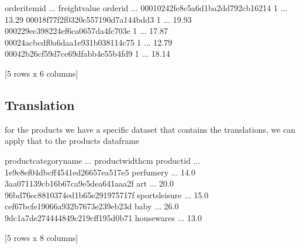 \documentclass[letterpaper,10pt,english]{jupyterBook}
\begin{document}
\begin{sphinxVerbatim}[commandchars=\\\{\}]
                                  order\PYGZus{}item\PYGZus{}id  ... freight\PYGZus{}value
order\PYGZus{}id                                         ...              
00010242fe8c5a6d1ba2dd792cb16214              1  ...         13.29
00018f77f2f0320c557190d7a144bdd3              1  ...         19.93
000229ec398224ef6ca0657da4fc703e              1  ...         17.87
00024acbcdf0a6daa1e931b038114c75              1  ...         12.79
00042b26cf59d7ce69dfabb4e55b4fd9              1  ...         18.14

[5 rows x 6 columns]
\end{sphinxVerbatim}


\subsection{Translation}
\label{\detokenize{c7_case_studies/Olist:translation}}
\sphinxAtStartPar
for the products we have a specific dataset that contains the translations, we can apply that to the products dataframe

\begin{sphinxVerbatim}[commandchars=\\\{\}]
    \PYG{p}{[}\PYG{p}{]}
\PYG{p}{[}\PYG{p}{]}  \PYG{p}{[}\PYG{p}{]}
\end{sphinxVerbatim}

\begin{sphinxVerbatim}[commandchars=\\\{\}]
                                 product\PYGZus{}category\PYGZus{}name  ...  product\PYGZus{}width\PYGZus{}cm
product\PYGZus{}id                                              ...                  
1e9e8ef04dbcff4541ed26657ea517e5             perfumery  ...              14.0
3aa071139cb16b67ca9e5dea641aaa2f                   art  ...              20.0
96bd76ec8810374ed1b65e291975717f        sports\PYGZus{}leisure  ...              15.0
cef67bcfe19066a932b7673e239eb23d                  baby  ...              26.0
9dc1a7de274444849c219cff195d0b71            housewares  ...              13.0

[5 rows x 8 columns]
\end{sphinxVerbatim}
\end{document}
